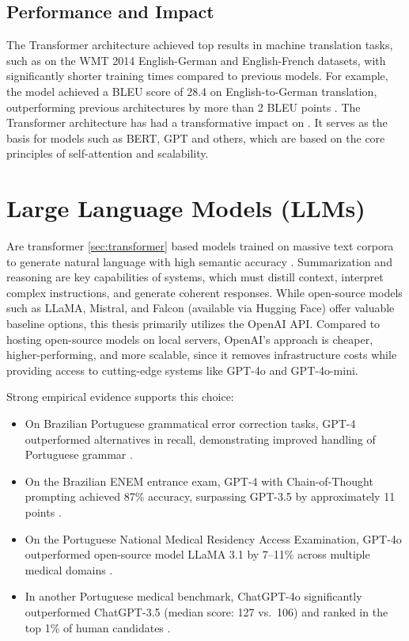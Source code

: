 



\subsection{Performance and Impact}  
The Transformer architecture achieved top results in machine translation tasks, such as on the WMT 2014 English-German and English-French datasets, with significantly shorter training times compared to previous models. For example, the model achieved a BLEU score of 28.4 on English-to-German translation, outperforming previous architectures by more than 2 BLEU points \cite{vaswani2017attention}.  
The Transformer architecture has had a transformative impact on  . It serves as the basis for  models such as BERT, GPT and others, which are based on the core principles of self-attention and scalability.

\section{Large Language Models (LLMs)}
\label{sec:llm}
Are transformer \ref{sec:transformer} based models trained on massive text corpora to generate natural language with high semantic accuracy \cite{bertpretrainingdeepbidirectional}.
Summarization and reasoning are key capabilities of  systems, which must distill context, interpret complex instructions, and generate coherent responses.
While open-source models such as LLaMA, Mistral, and Falcon (available via Hugging Face) offer valuable baseline options, this thesis primarily utilizes the OpenAI API. Compared to hosting open-source models on local servers, OpenAI’s approach is cheaper, higher-performing, and more scalable, since it removes infrastructure costs while providing access to cutting-edge systems like GPT-4o and GPT-4o-mini.

Strong empirical evidence supports this choice:
\begin{itemize}
  \item On Brazilian Portuguese grammatical error correction tasks, GPT-4 outperformed alternatives in recall, demonstrating improved handling of Portuguese grammar \cite{arxiv2306.15788}.
  \item On the Brazilian ENEM entrance exam, GPT-4 with Chain-of-Thought prompting achieved 87\% accuracy, surpassing GPT-3.5 by approximately 11 points \cite{arxiv2303.17003}.
  \item On the Portuguese National Medical Residency Access Examination, GPT-4o outperformed open-source model LLaMA 3.1 by 7–11\% across multiple medical domains \cite{pmc12166901}.
  \item In another Portuguese medical benchmark, ChatGPT-4o significantly outperformed ChatGPT-3.5 (median score: 127 vs.\ 106) and ranked in the top 1\% of human candidates \cite{amp2025gpt4o}.
\end{itemize}


